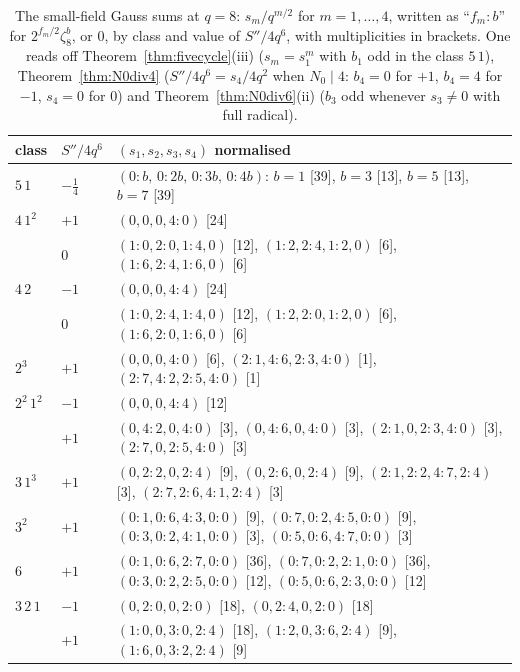\documentclass[12pt,a4paper]{amsart}
\theoremstyle{definition}
\newcommand{\Spp}{S''}
\begin{document}
\begin{table}[H]
\centering
\caption{The small-field Gauss sums at $q=8$: $s_m/q^{m/2}$ for $m=1,\dots,4$, written as ``$f_m{:}b$'' for $2^{f_m/2}\zeta_8^{b}$, or $0$, by class and value of $\Spp/4q^6$, with multiplicities in brackets. One reads off Theorem~\ref{thm:fivecycle}(iii) ($s_m=s_1^m$ with $b_1$ odd in the class $5\,1$), Theorem~\ref{thm:N0div4} ($\Spp/4q^6=s_4/4q^2$ when $N_0\mid4$: $b_4=0$ for $+1$, $b_4=4$ for $-1$, $s_4=0$ for $0$) and Theorem~\ref{thm:N0div6}(ii) ($b_3$ odd whenever $s_3\ne0$ with full radical).}\label{tab:smallgauss}
\scriptsize
\begin{tabular}{@{}lll@{}}
\toprule
class & $\Spp/4q^6$ & $(s_1,s_2,s_3,s_4)$ normalised\\
\midrule
$5\,1$ & $-\tfrac14$ & $(0{:}b,\,0{:}2b,\,0{:}3b,\,0{:}4b)$: $b=1$ [39], $b=3$ [13], $b=5$ [13], $b=7$ [39]\\
$4\,1^2$ & $+1$ & $(0,0,0,4{:}0)$ [24]\\
 & $0$ & $(1{:}0,2{:}0,1{:}4,0)$ [12], $(1{:}2,2{:}4,1{:}2,0)$ [6], $(1{:}6,2{:}4,1{:}6,0)$ [6]\\
$4\,2$ & $-1$ & $(0,0,0,4{:}4)$ [24]\\
 & $0$ & $(1{:}0,2{:}4,1{:}4,0)$ [12], $(1{:}2,2{:}0,1{:}2,0)$ [6], $(1{:}6,2{:}0,1{:}6,0)$ [6]\\
$2^3$ & $+1$ & $(0,0,0,4{:}0)$ [6], $(2{:}1,4{:}6,2{:}3,4{:}0)$ [1], $(2{:}7,4{:}2,2{:}5,4{:}0)$ [1]\\
$2^2\,1^2$ & $-1$ & $(0,0,0,4{:}4)$ [12]\\
 & $+1$ & $(0,4{:}2,0,4{:}0)$ [3], $(0,4{:}6,0,4{:}0)$ [3], $(2{:}1,0,2{:}3,4{:}0)$ [3], $(2{:}7,0,2{:}5,4{:}0)$ [3]\\
$3\,1^3$ & $+1$ & $(0,2{:}2,0,2{:}4)$ [9], $(0,2{:}6,0,2{:}4)$ [9], $(2{:}1,2{:}2,4{:}7,2{:}4)$ [3], $(2{:}7,2{:}6,4{:}1,2{:}4)$ [3]\\
$3^2$ & $+1$ & $(0{:}1,0{:}6,4{:}3,0{:}0)$ [9], $(0{:}7,0{:}2,4{:}5,0{:}0)$ [9], $(0{:}3,0{:}2,4{:}1,0{:}0)$ [3], $(0{:}5,0{:}6,4{:}7,0{:}0)$ [3]\\
$6$ & $+1$ & $(0{:}1,0{:}6,2{:}7,0{:}0)$ [36], $(0{:}7,0{:}2,2{:}1,0{:}0)$ [36], $(0{:}3,0{:}2,2{:}5,0{:}0)$ [12], $(0{:}5,0{:}6,2{:}3,0{:}0)$ [12]\\
$3\,2\,1$ & $-1$ & $(0,2{:}0,0,2{:}0)$ [18], $(0,2{:}4,0,2{:}0)$ [18]\\
 & $+1$ & $(1{:}0,0,3{:}0,2{:}4)$ [18], $(1{:}2,0,3{:}6,2{:}4)$ [9], $(1{:}6,0,3{:}2,2{:}4)$ [9]\\
\bottomrule
\end{tabular}
\end{table}
\end{document}
